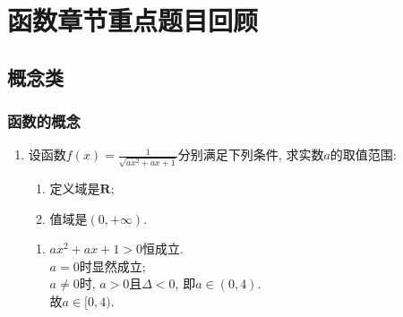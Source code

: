 \chapter*{函数章节重点题目回顾} %

\section*{概念类}
\subsection*{函数的概念}
\begin{enumerate}
\item 设函数$f(x)=\frac{1}{\sqrt{ax^2+ax+1}}$分别满足下列条件, 求实数$a$的取值范围: 
\begin{enumerate}
\item 定义域是$\mathbf{R}$; 
\item 值域是$(0,+\infty)$. 
\end{enumerate}
\begin{jieda}
\begin{enumerate}
    \item $ax^2+ax+1>0$恒成立. \\
    $a=0$时显然成立; \\
    $a\neq 0$时, $a>0$且$ \Delta<0$, 即$a\in(0,4)$. \\
    故$a\in[0,4)$. 
    

\end{enumerate}
\end{jieda}
\end{enumerate}
